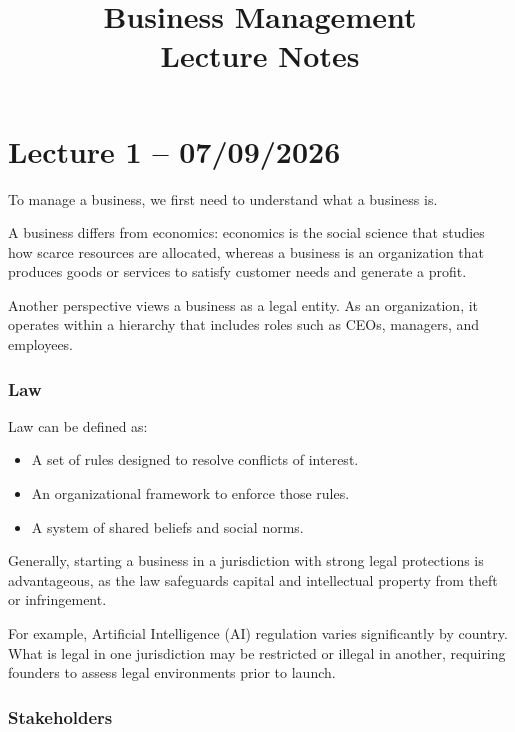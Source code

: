 \documentclass[12pt,a4paper]{report}
\begin{document}
\title{\textbf{Business Management}\\[0.5em]\large Lecture Notes}
\author{}
\date{}
\maketitle
\tableofcontents
\newpage

\chapter{Lecture 1 -- 07/09/2026}

To manage a business, we first need to understand what a business is.

A business differs from economics: economics is the social science that studies how scarce resources are allocated, whereas a business is an organization that produces goods or services to satisfy customer needs and generate a profit.

Another perspective views a business as a legal entity. As an organization, it operates within a hierarchy that includes roles such as CEOs, managers, and employees.

\subsection{Law}

Law can be defined as:
\begin{itemize}
    \item A set of rules designed to resolve conflicts of interest.
    \item An organizational framework to enforce those rules.
    \item A system of shared beliefs and social norms.
\end{itemize}

Generally, starting a business in a jurisdiction with strong legal protections is advantageous, as the law safeguards capital and intellectual property from theft or infringement.

For example, Artificial Intelligence (AI) regulation varies significantly by country. What is legal in one jurisdiction may be restricted or illegal in another, requiring founders to assess legal environments prior to launch.

\subsection{Stakeholders}
\end{document}
